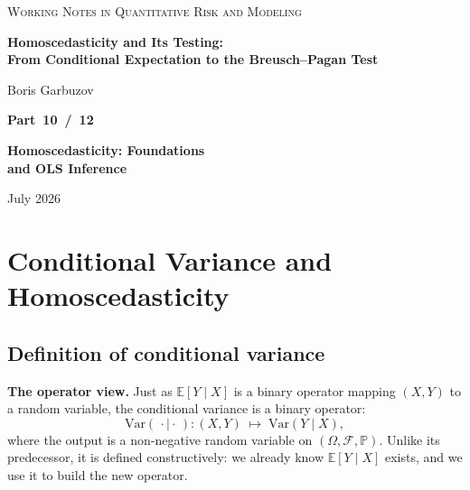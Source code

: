 \documentclass[a4paper,oneside,12pt]{extarticle}
\theoremstyle{plain}
\theoremstyle{definition}
\theoremstyle{remark}
\newcommand*{\E}{\mathbb{E}}
\newcommand*{\Var}{\mathrm{Var}}
\newcommand*{\mP}{\mathbb{P}}
\newcommand*{\mbF}{\mathcal{F}}
\begin{document}
\begin{titlepage}
\begin{center}

{\footnotesize\scshape\color{gray}
Working Notes in Quantitative Risk and Modeling
}

\vfill

{\LARGE\bfseries Homoscedasticity and Its Testing:\\[4pt]
From Conditional Expectation to the Breusch--Pagan Test}

\vspace{36pt}

{\normalsize Boris Garbuzov}

\vfill

{\Large\bfseries Part~10~/~12}

\vspace{6pt}

{\Large\bfseries Homoscedasticity: Foundations\\and OLS Inference}

\vfill

{\small July 2026}

\end{center}
\end{titlepage}

\setcounter{section}{0}   %
\setcounter{tocdepth}{2}
\tableofcontents
\newpage

\section{Conditional Variance and Homoscedasticity}
\label{sec:condvar}

\subsection{Definition of conditional variance}

\textbf{The operator view.}
Just as $\E[Y \mid X]$ is a binary operator mapping $(X,Y)$ to a random
variable, the conditional variance is a binary operator:
\[
  \Var(\,\cdot \mid \cdot\,): (X, Y) \;\longmapsto\; \Var(Y \mid X),
\]
where the output is a non-negative random variable on $(\Omega,\mbF,\mP)$.
Unlike its predecessor, it is defined constructively: we already know
$\E[Y \mid X]$ exists, and we use it to build the new operator.
\end{document}
